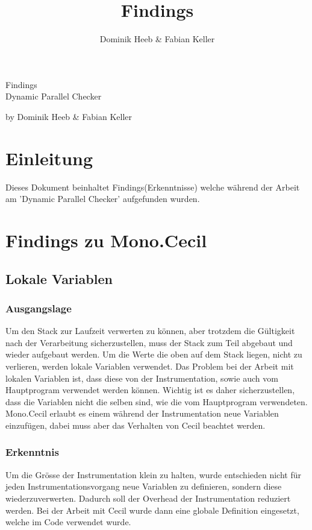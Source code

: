 \documentclass[10pt,a4paper]{article}
\author{Dominik Heeb \& Fabian Keller}
\title{Findings}
\begin{document}
\begin{titlepage}
	\begin{Huge}
		\begin{center}
				Findings \\Dynamic Parallel Checker\\[2.0cm]
		\end{center}
	\end{Huge}
	
	\begin{center}
		\begin{Large}
				by Dominik Heeb \& Fabian Keller\\[1.0cm]
		\end{Large}
	\end{center}
\end{titlepage}

\newpage
\tableofcontents 
\newpage

\section{Einleitung}
\begin{flushleft}
Dieses Dokument beinhaltet Findings(Erkenntnisse) welche während der Arbeit am 'Dynamic Parallel Checker' aufgefunden wurden.
\end{flushleft}
\section{Findings zu Mono.Cecil}
\subsection{Lokale Variablen}
\subsubsection{Ausgangslage}
\begin{flushleft}
Um den Stack zur Laufzeit verwerten zu können, aber trotzdem die Gültigkeit nach der Verarbeitung sicherzustellen, muss der Stack zum Teil abgebaut und wieder aufgebaut werden. Um die Werte die oben auf dem Stack liegen, nicht zu verlieren, werden lokale Variablen verwendet.
Das Problem bei der Arbeit mit lokalen Variablen ist, dass diese von der Instrumentation, sowie auch vom Hauptprogram verwendet werden können. Wichtig ist es daher sicherzustellen, dass die Variablen nicht die selben sind, wie die vom Hauptprogram verwendeten.
Mono.Cecil erlaubt es einem während der Instrumentation neue Variablen einzufügen, dabei muss aber das Verhalten von Cecil beachtet werden.
\end{flushleft}
\subsubsection{Erkenntnis}
\begin{flushleft}
Um die Grösse der Instrumentation klein zu halten, wurde entschieden nicht für jeden Instrumentationsvorgang neue Variablen zu definieren, sondern diese wiederzuverwerten. Dadurch soll der Overhead der Instrumentation reduziert werden.
Bei der Arbeit mit Cecil wurde dann eine globale Definition eingesetzt, welche im Code verwendet wurde.
\end{flushleft}
\end{document}
